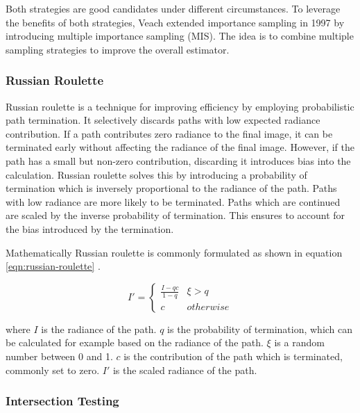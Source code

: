 Both strategies are good candidates under different circumstances. To leverage the benefits of both strategies, Veach extended importance sampling in 1997 \cite{veachMonteCarloLightTransport} by introducing multiple importance sampling (\gls{MIS}). The idea is to combine multiple sampling strategies to improve the overall estimator.

\subsubsection{Russian Roulette}
\label{ch:russianRoulette}

Russian roulette is a technique for improving efficiency by employing probabilistic path termination. It selectively discards paths with low expected radiance contribution. If a path contributes zero radiance to the final image, it can be terminated early without affecting the radiance of the final image. However, if the path has a small but non-zero contribution, discarding it introduces bias into the calculation. Russian roulette solves this by introducing a probability of termination which is inversely proportional to the radiance of the path. Paths with low radiance are more likely to be terminated. Paths which are continued are scaled by the inverse probability of termination. This ensures to account for the bias introduced by the termination.

Mathematically Russian roulette is commonly formulated as shown in equation \ref{eqn:russian-roulette} \cite{Pharr_Physically_Based_Rendering_2023}.

\begin{equation}
  \label{eqn:russian-roulette}
  I' = \begin{cases} \frac{I-qc}{1-q} & \xi > q \\ c & otherwise \end{cases}
\end{equation}
  
where $I$ is the radiance of the path. $q$ is the probability of termination, which can be calculated for example based on the radiance of the path. $\xi$ is a random number between 0 and 1. $c$ is the contribution of the path which is terminated, commonly set to zero. $I'$ is the scaled radiance of the path.

\subsubsection{Intersection Testing}

